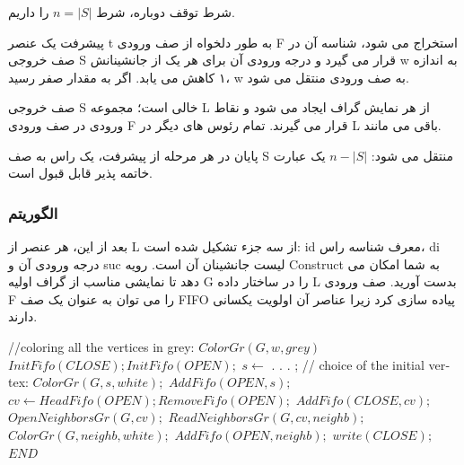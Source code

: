 \documentclass{book} %
\begin{document}
شرط توقف
دوباره، شرط $n = |S|$ را داریم.

پیشرفت 
یک عنصر t به طور دلخواه از صف ورودی F استخراج می شود، شناسه آن در صف خروجی S قرار می گیرد و درجه ورودی آن برای هر یک از جانشینانش w به اندازه ۱ کاهش می یابد. اگر به مقدار صفر رسید، w به صف ورودی منتقل می شود.

صف خروجی S خالی است؛ مجموعه L از هر نمایش گراف ایجاد می شود و نقاط ورودی در صف ورودی F قرار می گیرند. تمام رئوس های دیگر در L باقی می مانند.

پایان 
در هر مرحله از پیشرفت، یک راس به صف S منتقل می شود: $n − |S|$ یک عبارت خاتمه پذیر قابل قبول است.

\subsubsection*{الگوریتم}

بعد از این، هر عنصر از L از سه جزء تشکیل شده است: id معرف شناسه راس، di درجه ورودی آن و suc لیست جانشینان آن است. رویه Construct به شما امکان می دهد تا نمایشی مناسب از گراف اولیه G را در ساختار داده L بدست آورید. صف ورودی F را می توان به عنوان یک صف FIFO پیاده سازی کرد زیرا عناصر آن اولویت یکسانی دارند.


\begin{latin}
    
    \begin{algorithm}
        \caption{}\label{your_label}
        \begin{algorithmic}
            \STATE //coloring all the vertices in grey:
                \STATE $ColorGr(G, w, grey)$
            \ENDFOR
            \STATE $InitFifo(CLOSE); InitFifo(OPEN);$
            \STATE $s \leftarrow$ . . . ; // choice of the initial vertex:
            \STATE $ColorGr(G, s, white);$
            \STATE $AddFifo(OPEN, s);$
                \STATE $cv \leftarrow HeadFifo(OPEN); RemoveFifo(OPEN);$
                \STATE $AddFifo(CLOSE, cv);$
                \STATE $OpenNeighborsGr(G, cv);$
                    \STATE $ReadNeighborsGr(G, cv, neighb);$
                        \STATE $ColorGr(G, neighb, white);$
                        \STATE $AddFifo(OPEN, neighb);$
                    \ENDIF
                \ENDWHILE
            \ENDWHILE
            \STATE $write(CLOSE);$
            \STATE $END$
        \end{algorithmic}
    \end{algorithm}
        
\end{latin}
\end{document}
